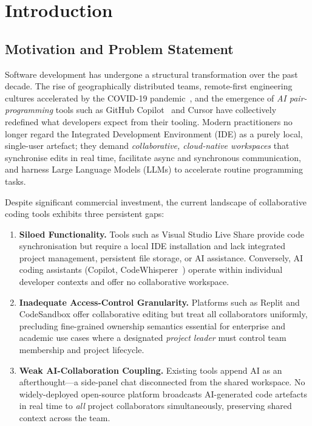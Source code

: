 \section{Introduction}
\label{sec:intro}

\subsection{Motivation and Problem Statement}

Software development has undergone a structural transformation over the past
decade. The rise of geographically distributed teams, remote-first engineering
cultures accelerated by the COVID-19 pandemic~\cite{ford2019remote}, and the
emergence of \textit{AI pair-programming} tools such as GitHub
Copilot~\cite{chen2021evaluating} and Cursor have collectively redefined what
developers expect from their tooling.  Modern practitioners no longer regard
the Integrated Development Environment (IDE) as a purely local, single-user
artefact; they demand \emph{collaborative, cloud-native workspaces} that
synchronise edits in real time, facilitate async and synchronous communication,
and harness Large Language Models (LLMs) to accelerate routine programming
tasks.

Despite significant commercial investment, the current landscape of
collaborative coding tools exhibits three persistent gaps:

\begin{enumerate}[leftmargin=*, label=\textbf{G\arabic*.}]
  \item \textbf{Siloed Functionality.} Tools such as Visual Studio Live Share
    provide code synchronisation but require a local IDE installation and lack
    integrated project management, persistent file storage, or AI assistance.
    Conversely, AI coding assistants (Copilot, CodeWhisperer~\cite{amazon2023codewhisperer})
    operate within individual developer contexts and offer no collaborative
    workspace.

  \item \textbf{Inadequate Access-Control Granularity.} Platforms such as
    Replit and CodeSandbox offer collaborative editing but treat all
    collaborators uniformly, precluding fine-grained ownership semantics
    essential for enterprise and academic use cases where a designated
    \emph{project leader} must control team membership and project lifecycle.

  \item \textbf{Weak AI-Collaboration Coupling.} Existing tools append AI as
    an afterthought---a side-panel chat disconnected from the shared workspace.
    No widely-deployed open-source platform broadcasts AI-generated code
    artefacts in real time to \emph{all} project collaborators simultaneously,
    preserving shared context across the team.
\end{enumerate}


